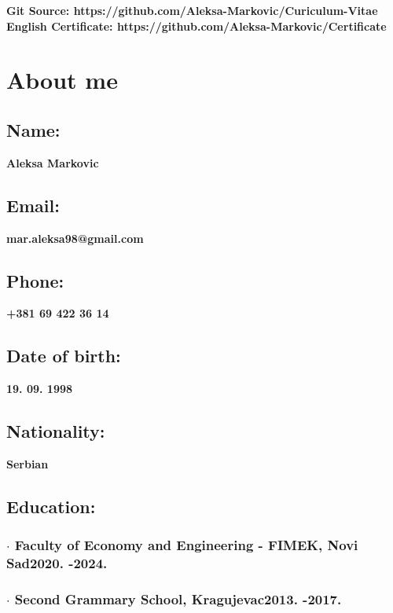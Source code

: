 \documentclass{article}
\author{\textbf{Aleksa Markovic}}
\renewcommand{\maketitle}{
	\begin{center}
		\vspace{.3em}
		{\LARGE\bfseries\theauthor}\break
		\vspace{.3em}
		{}\titlerule\break
		\vspace{.3em}
		{\textbf{\normalsize{Git Source: https://github.com/Aleksa-Markovic/Curiculum-Vitae}}}
		\\
		{\textbf{\normalsize{English Certificate: https://github.com/Aleksa-Markovic/Certificate}}}
	\end{center}	
}
\begin{document}
	\maketitle
	
	\vspace*{-\baselineskip}
	\section{\MakeUppercase{A}bout me}
	\subsection{\large{Name:}}
	\textbf{\large{Aleksa Markovic}}
	\subsection{\large{Email:}}
	\textbf{\large{mar.aleksa98@gmail.com}}
	\subsection{\large{Phone:}}
	\textbf{\large{+381 69 422 36 14}}
	\subsection{\large{Date of birth:}}
	\textbf{\large{19. 09. 1998}}
	\subsection{\large{Nationality:}}
	\textbf{\large{Serbian}}
	\subsection{\large{Education:}}
	\subsubsection{{$\cdot$ }Faculty of Economy and Engineering - FIMEK, Novi Sad\hfill 2020. -2024.}
	\subsubsection{{$\cdot$ }Second Grammary School, Kragujevac\hfill 2013. -2017.}
\end{document}
